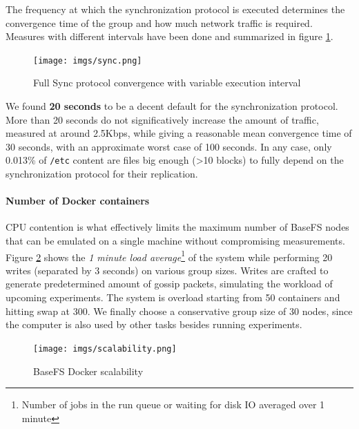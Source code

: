 \documentclass{sig-alternate}
\begin{document}
The frequency at which the synchronization protocol is executed determines the convergence time of the group and how much network traffic is required. Measures with different intervals have been done and summarized in figure \ref{fig:sync}.

\begin{figure}
\centering
\texttt{[image: imgs/sync.png]}
\caption{Full Sync protocol convergence with variable execution interval}
\label{fig:sync}
\end{figure}

We found \textbf{20 seconds} to be a decent default for the synchronization protocol. More than 20 seconds do not significatively increase the amount of traffic, measured at around 2.5Kbps, while giving a reasonable mean convergence time of 30 seconds, with an approximate worst case of 100 seconds. In any case, only 0.013\% of \texttt{/etc} content are files big enough (>10 blocks) to fully depend on the synchronization protocol for their replication.


\paragraph{Number of Docker containers}

CPU contention is what effectively limits the maximum number of BaseFS nodes that can be emulated on a single machine without compromising measurements. Figure \ref{fig:scalability} shows the \textit{1 minute load average}\footnote{Number of jobs in the run queue or waiting for disk IO averaged over 1 minute} of the system while performing 20 writes (separated by 3 seconds) on various group sizes. Writes are crafted to generate predetermined amount of gossip packets, simulating the workload of upcoming experiments. The system is overload starting from 50 containers and hitting swap at 300. We finally choose a conservative group size of 30 nodes, since the computer is also used by other tasks besides running experiments.


\begin{figure}
\centering
\texttt{[image: imgs/scalability.png]}
\caption{BaseFS Docker scalability}
\label{fig:scalability}
\end{figure}


\end{document}
